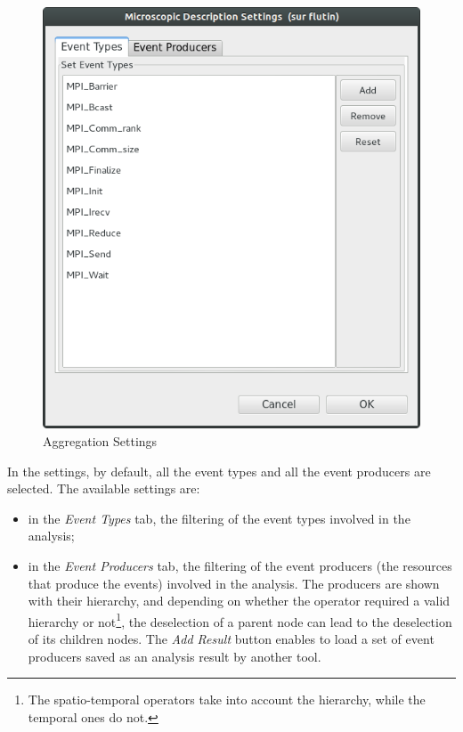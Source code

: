 \documentclass[twoside]{article}
\begin{document}
\begin{sloppypar}
\begin{figure}[h!]
	\centering
	\includegraphics[scale=0.4]{images/state_settings.png}
	\caption{Aggregation Settings}
	\label{microSettings}
\end{figure}

In the settings, by default, all the event types and all the event producers are selected. The available settings are:
\begin{itemize}
	\item in the \textit{Event Types} tab, the filtering of the event types involved in the analysis;
	\item in the \textit{Event Producers} tab, the filtering of the event producers (the resources that produce the events) involved in the analysis. The producers are shown with their hierarchy, and depending on whether the operator required a valid hierarchy or not\footnote{The spatio-temporal operators take into account the hierarchy, while the temporal ones do not.}, the deselection of a parent node can lead to the deselection of its children nodes. The \textit{Add Result} button enables to load a set of event producers saved as an analysis result by another tool.
\end{itemize}


\end{sloppypar}
\end{document}
